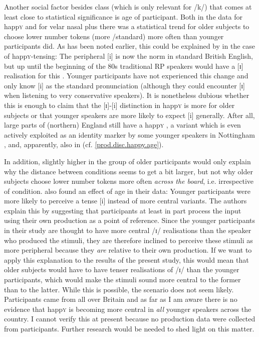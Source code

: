 Another social factor besides class (which is only relevant for /k/) that comes at least close to statistical significance is age of participant.
Both in the data for happ\textsc{y} and for velar nasal plus there was a statistical trend for older subjects to choose lower number tokens (more /standard) more often than younger participants did.
As has been noted earlier, this could be explained by  in the case of happ\textsc{y}-tensing: The peripheral [i] is now the norm in standard British English, but up until the beginning of the 80s traditional RP speakers would have a  [ɪ] realisation for this  \parencite[cf.][]{harrington2006}.
Younger participants have not experienced this change and only know [i] as the standard pronunciation (although they could encounter [ɪ] when listening to very conservative speakers).
It is nonetheless dubious whether this is enough to claim that the [ɪ]-[i] distinction in happ\textsc{y} is more  for older subjects or that younger speakers are more likely to expect [i] generally.
After all, large parts of (northern) England still have a  happ\textsc{y} , a variant which is even actively exploited as an identity marker by some younger speakers in Nottingham \parencite[cf.][]{flynn2010}, and, apparently, also in  (cf. \ref{prod.disc.happy.age}).

In addition, slightly higher  in the group of older participants would only explain why the distance between  conditions seems to get a bit larger, but not why older subjects choose lower number tokens more often \emph{across the board}, i.e. irrespective of  condition.
\textcite[878--879]{haydrager2010} also found an effect of age in their data: Younger participants were more likely to perceive a tense [i] instead of more central variants.
The authors explain this by suggesting that participants at least in part process the input using their own production as a point of reference.
Since the younger participants in their study are thought to have more central /ɪ/ realisations than the speaker who produced the stimuli, they are therefore inclined to perceive these stimuli as more peripheral because they \emph{are} relative to their own production.
If we want to apply this explanation to the results of the present study, this would mean that older subjects would have to have tenser realisations of /ɪ/ than the younger participants, which would make the stimuli sound more central to the former than to the latter.
While this is possible, the scenario does not seem likely.
Participants came from all over Britain and as far as I am aware there is no evidence that happ\textsc{y} is becoming more central in \emph{all} younger speakers across the country.
I cannot verify this at present because no production data were collected from participants.
Further research would be needed to shed light on this matter.

